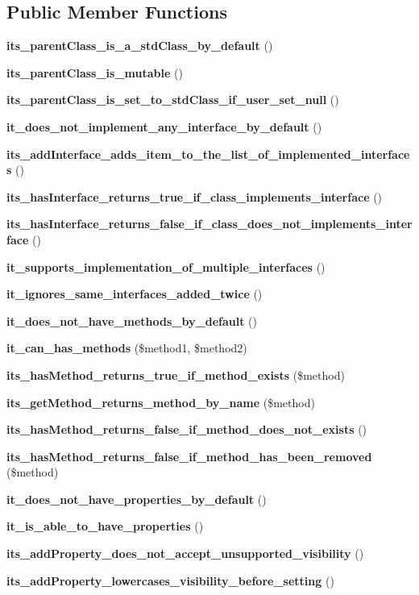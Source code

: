 \subsection*{Public Member Functions}
\begin{DoxyCompactItemize}
\item 
{\bf its\+\_\+parent\+Class\+\_\+is\+\_\+a\+\_\+std\+Class\+\_\+by\+\_\+default} ()
\item 
{\bf its\+\_\+parent\+Class\+\_\+is\+\_\+mutable} ()
\item 
{\bf its\+\_\+parent\+Class\+\_\+is\+\_\+set\+\_\+to\+\_\+std\+Class\+\_\+if\+\_\+user\+\_\+set\+\_\+null} ()
\item 
{\bf it\+\_\+does\+\_\+not\+\_\+implement\+\_\+any\+\_\+interface\+\_\+by\+\_\+default} ()
\item 
{\bf its\+\_\+add\+Interface\+\_\+adds\+\_\+item\+\_\+to\+\_\+the\+\_\+list\+\_\+of\+\_\+implemented\+\_\+interfaces} ()
\item 
{\bf its\+\_\+has\+Interface\+\_\+returns\+\_\+true\+\_\+if\+\_\+class\+\_\+implements\+\_\+interface} ()
\item 
{\bf its\+\_\+has\+Interface\+\_\+returns\+\_\+false\+\_\+if\+\_\+class\+\_\+does\+\_\+not\+\_\+implements\+\_\+interface} ()
\item 
{\bf it\+\_\+supports\+\_\+implementation\+\_\+of\+\_\+multiple\+\_\+interfaces} ()
\item 
{\bf it\+\_\+ignores\+\_\+same\+\_\+interfaces\+\_\+added\+\_\+twice} ()
\item 
{\bf it\+\_\+does\+\_\+not\+\_\+have\+\_\+methods\+\_\+by\+\_\+default} ()
\item 
{\bf it\+\_\+can\+\_\+has\+\_\+methods} (\$method1, \$method2)
\item 
{\bf its\+\_\+has\+Method\+\_\+returns\+\_\+true\+\_\+if\+\_\+method\+\_\+exists} (\$method)
\item 
{\bf its\+\_\+get\+Method\+\_\+returns\+\_\+method\+\_\+by\+\_\+name} (\$method)
\item 
{\bf its\+\_\+has\+Method\+\_\+returns\+\_\+false\+\_\+if\+\_\+method\+\_\+does\+\_\+not\+\_\+exists} ()
\item 
{\bf its\+\_\+has\+Method\+\_\+returns\+\_\+false\+\_\+if\+\_\+method\+\_\+has\+\_\+been\+\_\+removed} (\$method)
\item 
{\bf it\+\_\+does\+\_\+not\+\_\+have\+\_\+properties\+\_\+by\+\_\+default} ()
\item 
{\bf it\+\_\+is\+\_\+able\+\_\+to\+\_\+have\+\_\+properties} ()
\item 
{\bf its\+\_\+add\+Property\+\_\+does\+\_\+not\+\_\+accept\+\_\+unsupported\+\_\+visibility} ()
\item 
{\bf its\+\_\+add\+Property\+\_\+lowercases\+\_\+visibility\+\_\+before\+\_\+setting} ()
\end{DoxyCompactItemize}
